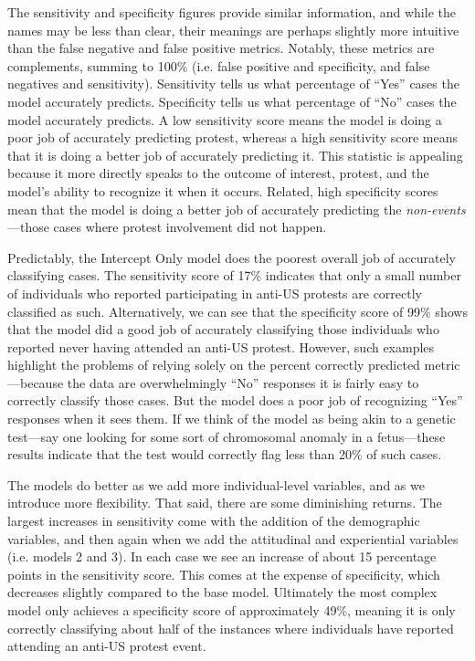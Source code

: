 The sensitivity and specificity figures provide similar information, and while the names may be less than clear, their meanings are perhaps slightly more intuitive than the false negative and false positive metrics. Notably, these metrics are complements, summing to 100\% (i.e. false positive and specificity, and false negatives and sensitivity). Sensitivity tells us what percentage of ``Yes'' cases the model accurately predicts. Specificity tells us what percentage of ``No'' cases the model accurately predicts. A low sensitivity score means the model is doing a poor job of accurately predicting protest, whereas a high sensitivity score means that it is doing a better job of accurately predicting it. This statistic is appealing because it more directly speaks to the outcome of interest, protest, and the model's ability to recognize it when it occurs. Related, high specificity scores mean that the model is doing a better job of accurately predicting the \emph{non-events}---those cases where protest involvement did not happen. 

Predictably, the Intercept Only model does the poorest overall job of accurately classifying cases. The sensitivity score of 17\% indicates that only a small number of individuals who reported participating in anti-US protests are correctly classified as such. Alternatively, we can see that the specificity score of 99\% shows that the model did a good job of accurately classifying those individuals who reported never having attended an anti-US protest. However, such examples highlight the problems of relying solely on the percent correctly predicted metric---because the data are overwhelmingly ``No'' responses it is fairly easy to correctly classify those cases. But the model does a poor job of recognizing ``Yes'' responses when it sees them. If we think of the model as being akin to a genetic test---say one looking for some sort of chromosomal anomaly in a fetus---these results indicate that the test would correctly flag less than 20\% of such cases.

The models do better as we add more individual-level variables, and as we introduce more flexibility. That said, there are some diminishing returns. The largest increases in sensitivity come with the addition of the demographic variables, and then again when we add the attitudinal and experiential variables (i.e. models 2 and 3). In each case we see an increase of about 15 percentage points in the sensitivity score. This comes at the expense of specificity, which decreases slightly compared to the base model. Ultimately the most complex model only achieves a specificity score of approximately 49\%, meaning it is only correctly classifying about half of the instances where individuals have reported attending an anti-US protest event.

